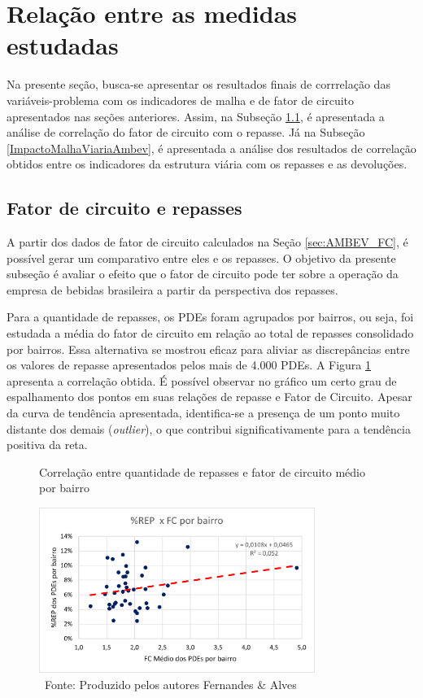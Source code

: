 \section{Relação entre as medidas estudadas} \label{sec:relMetricasAmbev}

Na presente seção, busca-se apresentar os resultados finais de corrrelação das variáveis-problema com os indicadores de malha e de fator de circuito apresentados nas seções anteriores. Assim, na Subseção \ref{FC_repAmbev}, é apresentada a análise de correlação do fator de circuito com o repasse. Já na Subseção \ref{ImpactoMalhaViariaAmbev}, é apresentada a análise dos resultados de correlação obtidos entre os indicadores da estrutura viária com os repasses e as devoluções.

\subsection{Fator de circuito e repasses} \label{FC_repAmbev}

A partir dos dados de fator de circuito calculados na Seção \ref{sec:AMBEV_FC}, é possível gerar um comparativo entre eles e os repasses. O objetivo da presente subseção é avaliar o efeito que o fator de circuito pode ter sobre a operação da empresa de bebidas brasileira a partir da perspectiva dos repasses.

Para a quantidade de repasses, os PDEs foram agrupados por bairros, ou seja, foi estudada a média do fator de circuito em relação ao total de repasses consolidado por bairros. 
%
Essa alternativa se mostrou eficaz para aliviar as discrepâncias entre os valores de repasse apresentados pelos mais de 4.000 PDEs.
%
A Figura \ref{fig:FC_repasse} apresenta a correlação obtida.
%
É possível observar no gráfico um certo grau de espalhamento dos pontos em suas relações de repasse e Fator de Circuito. 
Apesar da curva de tendência apresentada, identifica-se a presença de um ponto muito distante dos demais (\textit{outlier}), o que contribui significativamente para a tendência positiva da reta.

\begin{figure}[htb]
    \centering
    \caption{Correlação entre quantidade de repasses e fator de circuito médio por bairro}
    \includegraphics[width=0.8\textwidth]{images/5_emp_bebidas/excel_based/FC_bairros_novo.png}
    \caption*{\ Fonte: Produzido pelos autores Fernandes \& Alves}
    \label{fig:FC_repasse}
\end{figure}


